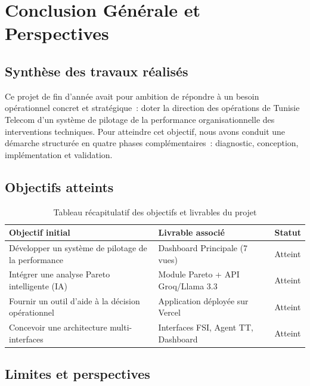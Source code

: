 \documentclass[11pt,a4paper]{report}
\begin{document}
\chapter*{Conclusion Générale et Perspectives}

\section*{Synthèse des travaux réalisés}

Ce projet de fin d'année avait pour ambition de répondre à un besoin opérationnel concret et stratégique~: doter la direction des opérations de Tunisie Telecom d'un système de pilotage de la performance organisationnelle des interventions techniques. Pour atteindre cet objectif, nous avons conduit une démarche structurée en quatre phases complémentaires~: diagnostic, conception, implémentation et validation.

\section*{Objectifs atteints}

\begin{table}[h!]
\centering
\caption{Tableau récapitulatif des objectifs et livrables du projet}
\begin{tabularx}{\textwidth}{X L{4.5cm} C{2cm}}
\toprule
\textbf{Objectif initial} & \textbf{Livrable associé} & \textbf{Statut} \\
\midrule
Développer un système de pilotage de la performance & Dashboard Principale (7 vues) & Atteint \\
Intégrer une analyse Pareto intelligente (IA)       & Module Pareto + API Groq/Llama 3.3 & Atteint \\
Fournir un outil d'aide à la décision opérationnel  & Application déployée sur Vercel & Atteint \\
Concevoir une architecture multi-interfaces          & Interfaces FSI, Agent TT, Dashboard & Atteint \\
\bottomrule
\end{tabularx}
\label{tab:objectifs}
\end{table}

\section*{Limites et perspectives}
\end{document}
